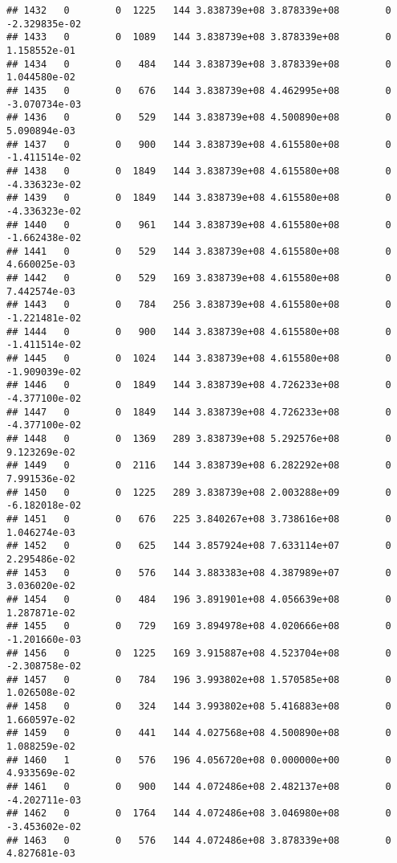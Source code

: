 \documentclass[
]{article}
\begin{document}
\begin{enumerate}
\begin{verbatim}
## 1432   0        0  1225   144 3.838739e+08 3.878339e+08        0 -2.329835e-02
## 1433   0        0  1089   144 3.838739e+08 3.878339e+08        0  1.158552e-01
## 1434   0        0   484   144 3.838739e+08 3.878339e+08        0  1.044580e-02
## 1435   0        0   676   144 3.838739e+08 4.462995e+08        0 -3.070734e-03
## 1436   0        0   529   144 3.838739e+08 4.500890e+08        0  5.090894e-03
## 1437   0        0   900   144 3.838739e+08 4.615580e+08        0 -1.411514e-02
## 1438   0        0  1849   144 3.838739e+08 4.615580e+08        0 -4.336323e-02
## 1439   0        0  1849   144 3.838739e+08 4.615580e+08        0 -4.336323e-02
## 1440   0        0   961   144 3.838739e+08 4.615580e+08        0 -1.662438e-02
## 1441   0        0   529   144 3.838739e+08 4.615580e+08        0  4.660025e-03
## 1442   0        0   529   169 3.838739e+08 4.615580e+08        0  7.442574e-03
## 1443   0        0   784   256 3.838739e+08 4.615580e+08        0 -1.221481e-02
## 1444   0        0   900   144 3.838739e+08 4.615580e+08        0 -1.411514e-02
## 1445   0        0  1024   144 3.838739e+08 4.615580e+08        0 -1.909039e-02
## 1446   0        0  1849   144 3.838739e+08 4.726233e+08        0 -4.377100e-02
## 1447   0        0  1849   144 3.838739e+08 4.726233e+08        0 -4.377100e-02
## 1448   0        0  1369   289 3.838739e+08 5.292576e+08        0  9.123269e-02
## 1449   0        0  2116   144 3.838739e+08 6.282292e+08        0  7.991536e-02
## 1450   0        0  1225   289 3.838739e+08 2.003288e+09        0 -6.182018e-02
## 1451   0        0   676   225 3.840267e+08 3.738616e+08        0  1.046274e-03
## 1452   0        0   625   144 3.857924e+08 7.633114e+07        0  2.295486e-02
## 1453   0        0   576   144 3.883383e+08 4.387989e+07        0  3.036020e-02
## 1454   0        0   484   196 3.891901e+08 4.056639e+08        0  1.287871e-02
## 1455   0        0   729   169 3.894978e+08 4.020666e+08        0 -1.201660e-03
## 1456   0        0  1225   169 3.915887e+08 4.523704e+08        0 -2.308758e-02
## 1457   0        0   784   196 3.993802e+08 1.570585e+08        0  1.026508e-02
## 1458   0        0   324   144 3.993802e+08 5.416883e+08        0  1.660597e-02
## 1459   0        0   441   144 4.027568e+08 4.500890e+08        0  1.088259e-02
## 1460   1        0   576   196 4.056720e+08 0.000000e+00        0  4.933569e-02
## 1461   0        0   900   144 4.072486e+08 2.482137e+08        0 -4.202711e-03
## 1462   0        0  1764   144 4.072486e+08 3.046980e+08        0 -3.453602e-02
## 1463   0        0   576   144 4.072486e+08 3.878339e+08        0  4.827681e-03

\end{verbatim}
\end{enumerate}
\end{document}
